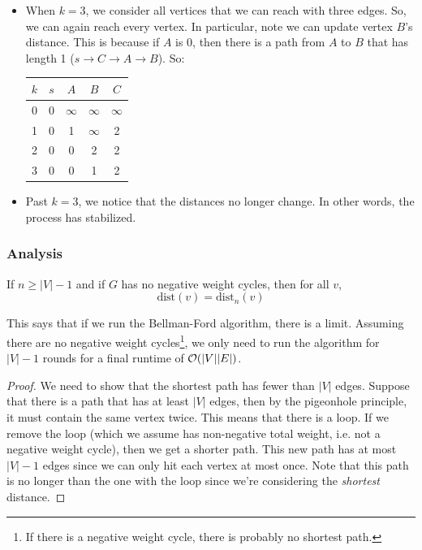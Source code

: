 \documentclass[letterpaper]{article}
\begin{document}
\begin{mdframed}[]
\begin{itemize}
        \item When $k = 3$, we consider all vertices that we can reach with three edges. So, we can again reach every vertex. In particular, note we can update vertex $B$'s distance. This is because if $A$ is 0, then there is a path from $A$ to $B$ that has length 1 ($s \to C \to A \to B$). So: 
        \begin{center}
            \begin{tabular}{c|c c c c}
                $k$ & $s$   & $A$       & $B$       & $C$ \\ 
                \hline 
                0   & 0     & $\infty$  & $\infty$  & $\infty$ \\ 
                1   & 0     & 1         & $\infty$  & 2 \\ 
                2   & 0     & 0         & 2         & 2 \\ 
                3   & 0     & 0         & 1         & 2
            \end{tabular}
        \end{center}

        \item Past $k = 3$, we notice that the distances no longer change. In other words, the process has stabilized. 
    \end{itemize}
\end{mdframed}

\subsubsection{Analysis}
\begin{proposition}
    If $n \geq |V| - 1$ and if $G$ has no negative weight cycles, then for all $v$,
    \[\text{dist}(v) = \text{dist}_{n}(v)\]
\end{proposition}
This says that if we run the Bellman-Ford algorithm, there is a limit. Assuming there are no negative weight cycles\footnote{If there is a negative weight cycle, there is probably no shortest path.}, we only need to run the algorithm for $|V| - 1$ rounds for a final runtime of $\mathcal{O}(|V||E|)$.

\begin{mdframed}[]
    \begin{proof}
        We need to show that the shortest path has fewer than $|V|$ edges. Suppose that there is a path that has at least $|V|$ edges, then by the pigeonhole principle, it must contain the same vertex twice. This means that there is a loop. If we remove the loop (which we assume has non-negative total weight, i.e. not a negative weight cycle), then we get a shorter path. This new path has at most $|V| - 1$ edges since we can only hit each vertex at most once. Note that this path is no longer than the one with the loop since we're considering the \emph{shortest} distance. 
    \end{proof}
\end{mdframed}
\end{document}

